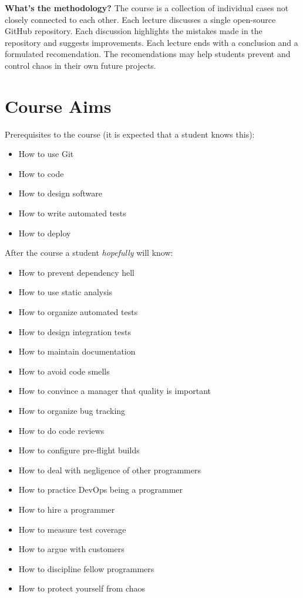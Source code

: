 \documentclass[nobrand,anonymous,nodate,nosecurity]{huawei}
\begin{document}
{\textbf{What's the methodology?}
The course is a collection of individual cases not
closely connected to each other. Each lecture discusses a single open-source
GitHub repository. Each discussion highlights the mistakes made in the
repository and suggests improvements. Each lecture ends with a conclusion
and a formulated recomendation. The recomendations may help students
prevent and control chaos in their own future projects.

\newpage
\section*{Course Aims}

Prerequisites to the course (it is expected that a student knows this):

\begin{itemize}
\item How to use Git
\item How to code
\item How to design software
\item How to write automated tests
\item How to deploy
\end{itemize}

After the course a student \emph{hopefully} will know:

\begin{itemize}
\item How to prevent dependency hell
\item How to use static analysis
\item How to organize automated tests
\item How to design integration tests
\item How to maintain documentation
\item How to avoid code smells
\item How to convince a manager that quality is important
\item How to organize bug tracking
\item How to do code reviews
\item How to configure pre-flight builds
\item How to deal with negligence of other programmers
\item How to practice DevOps being a programmer
\item How to hire a programmer
\item How to measure test coverage
\item How to argue with customers
\item How to discipline fellow programmers
\item How to protect yourself from chaos
\end{itemize}

}
\end{document}
